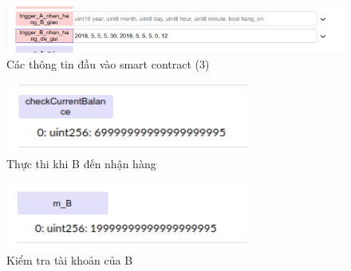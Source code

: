 \begin{figure}[tph]
	\centering
	\includegraphics[width=14cm]{snapshot/12.png}
	\vspace{0.3cm}
	\caption{Các thông tin đầu vào smart contract (3)}
	\label{fig:fig12}
\end{figure}

\begin{figure}[tph]
	\centering
	\includegraphics[width=8cm]{snapshot/13.png}
	\vspace{0.3cm}
	\caption{Thực thi khi B đến nhận hàng}
	\label{fig:fig13}
\end{figure}


\begin{figure}[tph]
	\centering
	\includegraphics[width=8cm]{snapshot/14.png}
	\vspace{0.3cm}
	\caption{Kiểm tra tài khoản của B}
	\label{fig:fig14}
\end{figure}